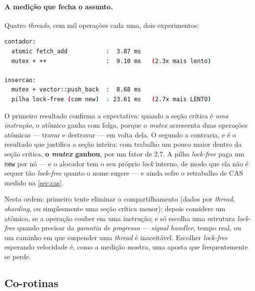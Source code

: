 \paragraph{A medição que fecha o assunto.} Quatro \emph{threads}, cem mil
operações cada uma, dois experimentos:

\begin{lstlisting}[style=bt, language=bash,
    caption={Saída de \texttt{src/concurrency2/}: 4 \emph{threads} $\times$
             100\,000 operações.}]
contador:
  atomic fetch_add           :  3.87 ms
  mutex + ++                 :  9.10 ms   (2.3x mais lento)

insercao:
  mutex + vector::push_back  :  8.68 ms
  pilha lock-free (com new)  : 23.61 ms   (2.7x mais LENTO)
\end{lstlisting}

O primeiro resultado confirma a expectativa: quando a seção crítica é \emph{uma
instrução}, o atômico ganha com folga, porque o \emph{mutex} acrescenta duas
operações atômicas --- travar e destravar --- em volta dela. O segundo a
contraria, e é o resultado que justifica a seção inteira: com trabalho um pouco
maior dentro da seção crítica, \textbf{o \emph{mutex} ganhou}, por um fator de
2,7. A pilha \emph{lock-free} paga um \texttt{new} por nó --- e o alocador tem o
seu próprio \emph{lock} interno, de modo que ela não é sequer tão
\emph{lock-free} quanto o nome sugere --- e ainda sofre o retrabalho de CAS
medido na \cref{sec:cas}.

\begin{regra}
Nesta ordem: primeiro tente eliminar o compartilhamento (dados por
\emph{thread}, \emph{sharding}, ou simplesmente uma seção crítica menor); depois
considere um atômico, se a operação couber em uma instrução; e só escolha uma
estrutura \emph{lock-free} quando precisar da \emph{garantia de progresso} ---
\emph{signal handler}, tempo real, ou um caminho em que suspender uma
\emph{thread} é inaceitável. Escolher \emph{lock-free} esperando velocidade é,
como a medição mostra, uma aposta que frequentemente se perde.
\end{regra}

\subsection{Co-rotinas}
\label{sec:coroutines}

